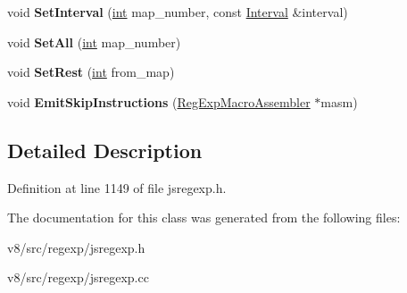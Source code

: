 \begin{DoxyCompactItemize}
\item 
\mbox{\label{classv8_1_1internal_1_1BoyerMooreLookahead_a10f6403132f37e64c3ea5b02e1476b1c}} 
void {\bfseries Set\+Interval} (\mbox{\hyperlink{classint}{int}} map\+\_\+number, const \mbox{\hyperlink{classv8_1_1internal_1_1Interval}{Interval}} \&interval)
\item 
\mbox{\label{classv8_1_1internal_1_1BoyerMooreLookahead_a36418e6a797298179b6386f16462b7d8}} 
void {\bfseries Set\+All} (\mbox{\hyperlink{classint}{int}} map\+\_\+number)
\item 
\mbox{\label{classv8_1_1internal_1_1BoyerMooreLookahead_aa0c55e2cb8b8bb1c6781fead233fb37f}} 
void {\bfseries Set\+Rest} (\mbox{\hyperlink{classint}{int}} from\+\_\+map)
\item 
\mbox{\label{classv8_1_1internal_1_1BoyerMooreLookahead_ade25cef1e93047f545c040b8b1af156d}} 
void {\bfseries Emit\+Skip\+Instructions} (\mbox{\hyperlink{classv8_1_1internal_1_1RegExpMacroAssembler}{Reg\+Exp\+Macro\+Assembler}} $\ast$masm)
\end{DoxyCompactItemize}


\subsection{Detailed Description}


Definition at line 1149 of file jsregexp.\+h.



The documentation for this class was generated from the following files\+:\begin{DoxyCompactItemize}
\item 
v8/src/regexp/jsregexp.\+h\item 
v8/src/regexp/jsregexp.\+cc\end{DoxyCompactItemize}
